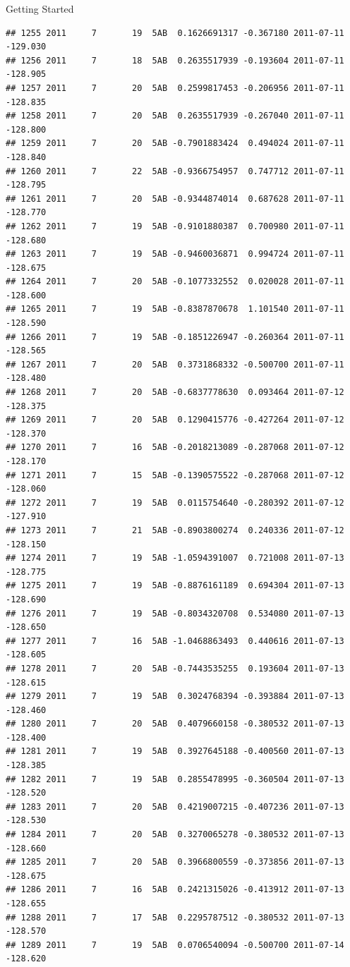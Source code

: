 \documentclass[
  ignorenonframetext,
]{beamer}
\begin{document}
\begin{frame}[fragile]{Getting Started}
\begin{verbatim}
## 1255 2011     7       19  5AB  0.1626691317 -0.367180 2011-07-11 -129.030
## 1256 2011     7       18  5AB  0.2635517939 -0.193604 2011-07-11 -128.905
## 1257 2011     7       20  5AB  0.2599817453 -0.206956 2011-07-11 -128.835
## 1258 2011     7       20  5AB  0.2635517939 -0.267040 2011-07-11 -128.800
## 1259 2011     7       20  5AB -0.7901883424  0.494024 2011-07-11 -128.840
## 1260 2011     7       22  5AB -0.9366754957  0.747712 2011-07-11 -128.795
## 1261 2011     7       20  5AB -0.9344874014  0.687628 2011-07-11 -128.770
## 1262 2011     7       19  5AB -0.9101880387  0.700980 2011-07-11 -128.680
## 1263 2011     7       19  5AB -0.9460036871  0.994724 2011-07-11 -128.675
## 1264 2011     7       20  5AB -0.1077332552  0.020028 2011-07-11 -128.600
## 1265 2011     7       19  5AB -0.8387870678  1.101540 2011-07-11 -128.590
## 1266 2011     7       19  5AB -0.1851226947 -0.260364 2011-07-11 -128.565
## 1267 2011     7       20  5AB  0.3731868332 -0.500700 2011-07-11 -128.480
## 1268 2011     7       20  5AB -0.6837778630  0.093464 2011-07-12 -128.375
## 1269 2011     7       20  5AB  0.1290415776 -0.427264 2011-07-12 -128.370
## 1270 2011     7       16  5AB -0.2018213089 -0.287068 2011-07-12 -128.170
## 1271 2011     7       15  5AB -0.1390575522 -0.287068 2011-07-12 -128.060
## 1272 2011     7       19  5AB  0.0115754640 -0.280392 2011-07-12 -127.910
## 1273 2011     7       21  5AB -0.8903800274  0.240336 2011-07-12 -128.150
## 1274 2011     7       19  5AB -1.0594391007  0.721008 2011-07-13 -128.775
## 1275 2011     7       19  5AB -0.8876161189  0.694304 2011-07-13 -128.690
## 1276 2011     7       19  5AB -0.8034320708  0.534080 2011-07-13 -128.650
## 1277 2011     7       16  5AB -1.0468863493  0.440616 2011-07-13 -128.605
## 1278 2011     7       20  5AB -0.7443535255  0.193604 2011-07-13 -128.615
## 1279 2011     7       19  5AB  0.3024768394 -0.393884 2011-07-13 -128.460
## 1280 2011     7       20  5AB  0.4079660158 -0.380532 2011-07-13 -128.400
## 1281 2011     7       19  5AB  0.3927645188 -0.400560 2011-07-13 -128.385
## 1282 2011     7       19  5AB  0.2855478995 -0.360504 2011-07-13 -128.520
## 1283 2011     7       20  5AB  0.4219007215 -0.407236 2011-07-13 -128.530
## 1284 2011     7       20  5AB  0.3270065278 -0.380532 2011-07-13 -128.660
## 1285 2011     7       20  5AB  0.3966800559 -0.373856 2011-07-13 -128.675
## 1286 2011     7       16  5AB  0.2421315026 -0.413912 2011-07-13 -128.655
## 1288 2011     7       17  5AB  0.2295787512 -0.380532 2011-07-13 -128.570
## 1289 2011     7       19  5AB  0.0706540094 -0.500700 2011-07-14 -128.620

\end{verbatim}
\end{frame}
\end{document}
